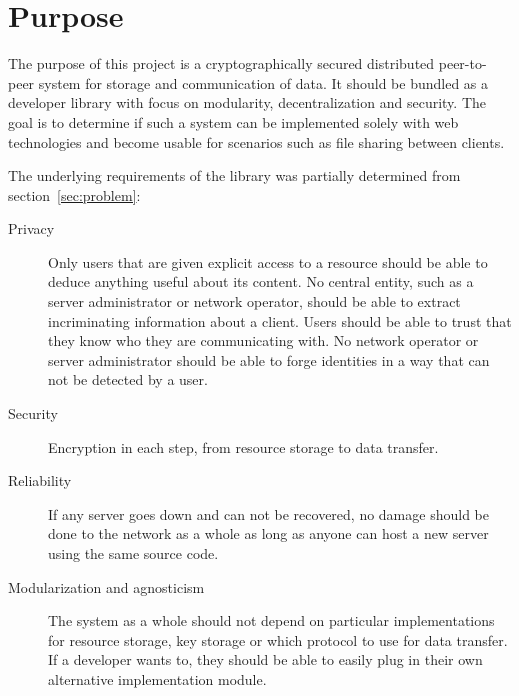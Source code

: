 \section{Purpose}\label{sec:purpose}


The purpose of this project is a cryptographically secured distributed peer-to-peer system for storage and communication of data. It should be bundled as a developer library with focus on modularity, decentralization and security. The goal is to determine if such a system can be implemented solely with web technologies and become usable for scenarios such as file sharing between clients.

The underlying requirements of the library was partially determined from section~\ref{sec:problem}:

\begin{description}
  \item[Privacy] Only users that are given explicit access to a resource should be able to deduce anything useful about its content. No central entity, such as a server administrator or network operator, should be able to extract incriminating information about a client. Users should be able to trust that they know who they are communicating with. No network operator or server administrator should be able to forge identities in a way that can not be detected by a user.

\item[Security] Encryption in each step, from resource storage to data transfer.

\item[Reliability] If any server goes down and can not be recovered, no damage should be done to the network as a whole as long as anyone can host a new server using the same source code.

\item[Modularization and agnosticism] The system as a whole should not depend on particular implementations for resource storage, key storage or which protocol to use for data transfer. If a developer wants to, they should be able to easily plug in their own alternative implementation module.

\end{description}
